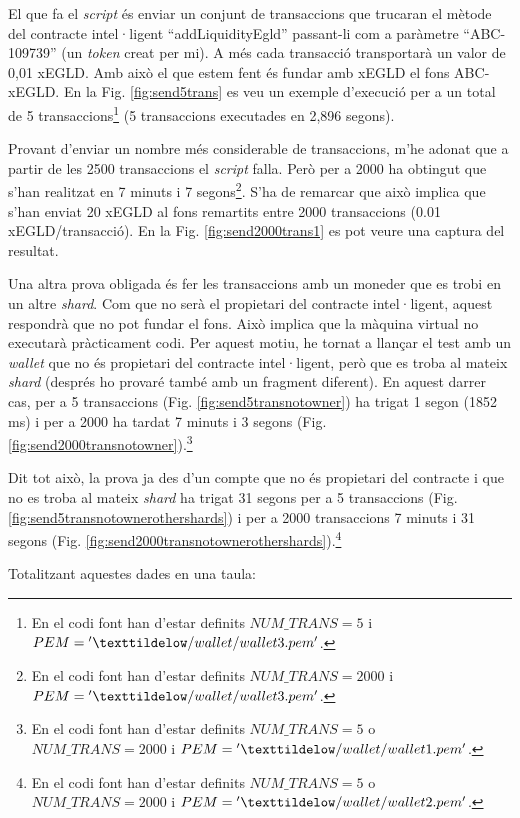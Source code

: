 \documentclass[11pt,a4paper]{article}
\begin{document}
El que fa el \textit{script} és enviar un conjunt de transaccions que trucaran el mètode del contracte intel·ligent ``addLiquidityEgld'' passant-li com a paràmetre ``ABC-109739'' (un \textit{token} creat per mi). A més cada transacció transportarà un valor de 0,01 xEGLD. Amb això el que estem fent és fundar amb xEGLD el fons ABC-xEGLD. En la Fig. \ref{fig:send5trans} es veu un exemple d'execució per a un total de 5 transaccions\footnote{En el codi font han d'estar definits \({NUM\_TRANS=5}\) i \({PEM={'\texttildelow/wallet/wallet3.pem'}}\).} (5 transaccions executades en 2,896 segons).

Provant d'enviar un nombre més considerable de transaccions, m'he adonat que a partir de les 2500 transaccions el \textit{script} falla. Però per a 2000 ha obtingut que s'han realitzat en 7 minuts i 7 segons\footnote{En el codi font han d'estar definits \({NUM\_TRANS=2000}\) i \({PEM={'\texttildelow/wallet/wallet3.pem'}}\).}. S'ha de remarcar que això implica que s'han enviat 20 xEGLD al fons remartits entre 2000 transaccions (0.01 xEGLD/transacció). En la Fig. \ref{fig:send2000trans1} es pot veure una captura del resultat.	

Una altra prova obligada és fer les transaccions amb un moneder que es trobi en un altre \textit{shard}. Com que no serà el propietari del contracte intel·ligent, aquest respondrà que no pot fundar el fons. Això implica que la màquina virtual no executarà pràcticament codi. Per aquest motiu, he tornat a llançar el test amb un \textit{wallet} que no és propietari del contracte intel·ligent, però que es troba al mateix \textit{shard} (després ho provaré també amb un fragment diferent). En aquest darrer cas, per a 5 transaccions (Fig. \ref{fig:send5transnotowner}) ha trigat 1 segon (1852 ms) i per a 2000 ha tardat 7 minuts i 3 segons (Fig. \ref{fig:send2000transnotowner}).\footnote{En el codi font han d'estar definits \({NUM\_TRANS=5}\) o \({NUM\_TRANS=2000}\) i \({PEM={'\texttildelow/wallet/wallet1.pem'}}\).}

Dit tot això, la prova ja des d'un compte que no és propietari del contracte i que no es troba al mateix \textit{shard} ha trigat 31 segons per a 5 transaccions (Fig. \ref{fig:send5transnotownerothershards}) i per a 2000 transaccions 7 minuts i 31 segons (Fig. \ref{fig:send2000transnotownerothershards}).\footnote{En el codi font han d'estar definits \({NUM\_TRANS=5}\) o \({NUM\_TRANS=2000}\) i \({PEM={'\texttildelow/wallet/wallet2.pem'}}\).}

Totalitzant aquestes dades en una taula:
\end{document}
